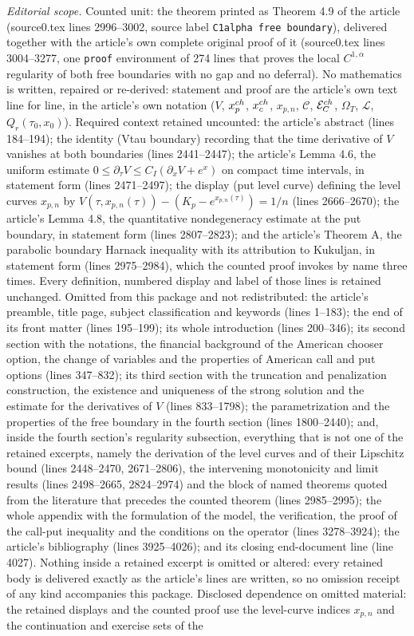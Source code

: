\documentclass[10pt,a4paper]{amsart}
\begin{document}
\noindent\textit{Editorial scope.} Counted unit: the theorem printed as Theorem 4.9 of the article (source0.tex lines 2996--3002, source label \texttt{C1alpha free boundary}), delivered together with the article's own complete original proof of it (source0.tex lines 3004--3277, one \texttt{proof} environment of 274 lines that proves the local $C^{1,\alpha}$ regularity of both free boundaries with no gap and no deferral). No mathematics is written, repaired or re-derived: statement and proof are the article's own text line for line, in the article's own notation ($V$, $x_p^{\rm ch}$, $x_c^{\rm ch}$, $x_{p,n}$, $\mathcal C$, $\mathcal E_C^{\rm ch}$, $\Omega_T$, $\mathcal L$, $Q_r(\tau_0,x_0)$). Required context retained uncounted: the article's abstract (lines 184--194); the identity (Vtau boundary) recording that the time derivative of $V$ vanishes at both boundaries (lines 2441--2447); the article's Lemma 4.6, the uniform estimate $0\leq\partial_\tau V\leq C_I(\partial_xV+e^x)$ on compact time intervals, in statement form (lines 2471--2497); the display (put level curve) defining the level curves $x_{p,n}$ by $V(\tau,x_{p,n}(\tau))-(K_p-e^{x_{p,n}(\tau)})=1/n$ (lines 2666--2670); the article's Lemma 4.8, the quantitative nondegeneracy estimate at the put boundary, in statement form (lines 2807--2823); and the article's Theorem A, the parabolic boundary Harnack inequality with its attribution to Kukuljan, in statement form (lines 2975--2984), which the counted proof invokes by name three times. Every definition, numbered display and label of those lines is retained unchanged. Omitted from this package and not redistributed: the article's preamble, title page, subject classification and keywords (lines 1--183); the end of its front matter (lines 195--199); its whole introduction (lines 200--346); its second section with the notations, the financial background of the American chooser option, the change of variables and the properties of American call and put options (lines 347--832); its third section with the truncation and penalization construction, the existence and uniqueness of the strong solution and the estimate for the derivatives of $V$ (lines 833--1798); the parametrization and the properties of the free boundary in the fourth section (lines 1800--2440); and, inside the fourth section's regularity subsection, everything that is not one of the retained excerpts, namely the derivation of the level curves and of their Lipschitz bound (lines 2448--2470, 2671--2806), the intervening monotonicity and limit results (lines 2498--2665, 2824--2974) and the block of named theorems quoted from the literature that precedes the counted theorem (lines 2985--2995); the whole appendix with the formulation of the model, the verification, the proof of the call-put inequality and the conditions on the operator (lines 3278--3924); the article's bibliography (lines 3925--4026); and its closing end-document line (line 4027). Nothing inside a retained excerpt is omitted or altered: every retained body is delivered exactly as the article's lines are written, so no omission receipt of any kind accompanies this package. Disclosed dependence on omitted material: the retained displays and the counted proof use the level-curve indices $x_{p,n}$ and the continuation and exercise sets of the 
\end{document}
